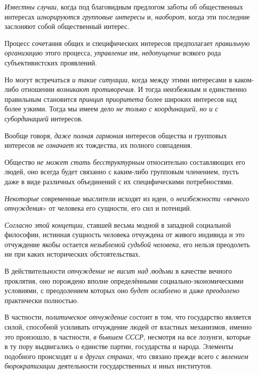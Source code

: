\documentclass[a4paper,14pt,russian]{extreport}
\begin{document}
\emph{Известны случаи}, когда под благовидным предлогом заботы об общественных интересах \emph{игнорируются групповые интересы} и, \emph{наоборот}, когда эти последние заслоняют собой общественный интерес.

Процесс сочетания общих и специфических интересов предполагает \emph{правильную организацию} этого процесса, \emph{управление} им, \emph{недопущение} всякого рода субъективистских проявлений.

Но могут встречаться \emph{и такие ситуации}, когда между этими интересами в каком-либо отношении \emph{возникают противоречия}. И тогда неизбежным и единственно правильным становится \emph{принцип приоритета} более широких интересов над более узкими. Тогда мы имеем дело \emph{не только с координацией}, \emph{но и с субординацией} интересов.

Вообще говоря, \emph{даже полная гармония} интересов общества и групповых интересов \emph{не означает} их тождества, их полного совпадения.

Общество \emph{не может стать бесструктурным} относительно составляющих его людей, оно всегда будет связанно с каким-либо групповым членением, пусть даже в виде различных объединений с их специфическими потребностями.

\emph{Некоторые} современные мыслители исходят из идеи, о \emph{неизбежности} «\emph{вечного отчуждения}» от человека его сущности, его сил и потенций.

\emph{Согласно этой концепции}, ставшей весьма модной в западной социальной философии, истинная сущность человека отчуждена от живого индивида и это отчуждение якобы остается \emph{незыблемой судьбой человека}, его нельзя преодолеть ни при каких исторических обстоятельствах.

В действительности \emph{отчуждение не висит над людьми} в качестве вечного проклятия, оно порождено вполне определёнными социально-экономическими условиями, с преодолением которых оно \emph{будет ослаблено} и даже \emph{преодолено} практически полностью.

В частности, \emph{политическое отчуждение} состоит в том, что государство является силой, способной усиливать отчуждение людей от властных механизмов, именно это произошло, в частности, \emph{в бывшем СССР}, несмотря на все лозунги, которые в ту пору выдвигались о единстве партии, государства и народа. Элементы подобного происходят \emph{и в других странах}, что связано прежде всего с \emph{явлением бюрократизации} деятельности государственных и иных институтов.
\end{document}
